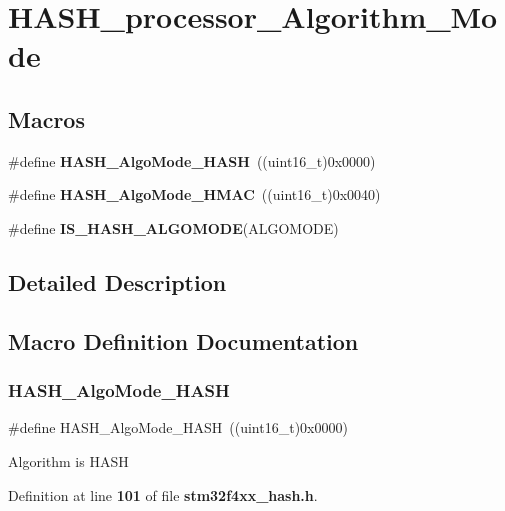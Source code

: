\section{H\+A\+S\+H\+\_\+processor\+\_\+\+Algorithm\+\_\+\+Mode}
\label{group__HASH__processor__Algorithm__Mode}
\subsection*{Macros}
\begin{DoxyCompactItemize}
\item 
\#define \textbf{ H\+A\+S\+H\+\_\+\+Algo\+Mode\+\_\+\+H\+A\+SH}~((uint16\+\_\+t)0x0000)
\item 
\#define \textbf{ H\+A\+S\+H\+\_\+\+Algo\+Mode\+\_\+\+H\+M\+AC}~((uint16\+\_\+t)0x0040)
\item 
\#define \textbf{ I\+S\+\_\+\+H\+A\+S\+H\+\_\+\+A\+L\+G\+O\+M\+O\+DE}(A\+L\+G\+O\+M\+O\+DE)
\end{DoxyCompactItemize}


\subsection{Detailed Description}


\subsection{Macro Definition Documentation}
\mbox{\label{group__HASH__processor__Algorithm__Mode_ga4de18ef48bad8fe403226abe769bd921}} 
\subsubsection{H\+A\+S\+H\+\_\+\+Algo\+Mode\+\_\+\+H\+A\+SH}
{\footnotesize\ttfamily \#define H\+A\+S\+H\+\_\+\+Algo\+Mode\+\_\+\+H\+A\+SH~((uint16\+\_\+t)0x0000)}

Algorithm is H\+A\+SH 

Definition at line \textbf{ 101} of file \textbf{ stm32f4xx\+\_\+hash.\+h}.

